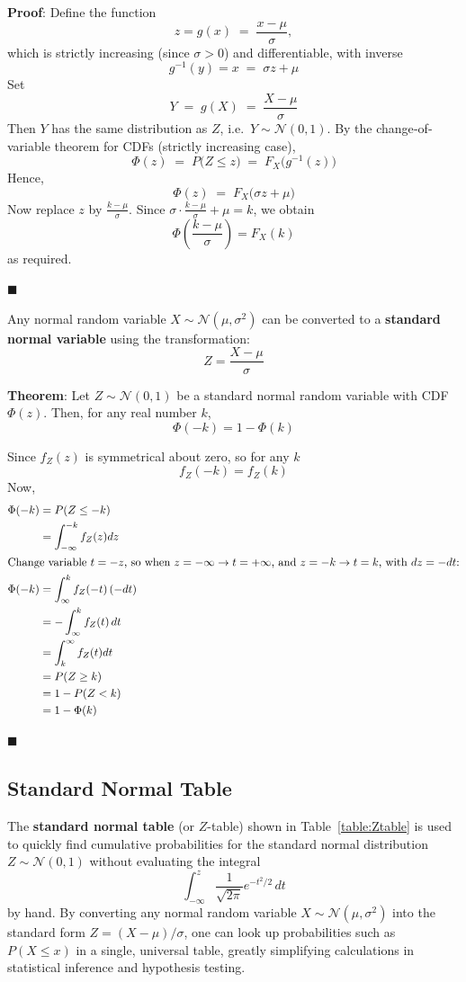 \documentclass[twoside]{book}
\begin{document}
\textbf{Proof}: Define the function
\[
z = g(x) \;=\; \frac{x - \mu}{\sigma},
\]
which is strictly increasing (since \(\sigma>0\)) and differentiable, with inverse
\[
g^{-1}(y) = x \;=\; \sigma z + \mu
\]
Set
\[
Y \;=\; g(X) \;=\; \frac{X - \mu}{\sigma}
\]
Then \(Y\) has the same distribution as \(Z\), i.e.\ \(Y\sim \mathcal{N}(0,1)\).  By the change‐of‐variable theorem for CDFs (strictly increasing case),
\[
\Phi(z)
\;=\;
P\bigl(Z \le z\bigr)
\;=\;
F_X\!\bigl(g^{-1}(z)\bigr)
\]
Hence,
\[
\Phi(z)
\;=\;
F_X\!\bigl(\sigma z + \mu\bigr)
\]
Now replace \(z\) by \(\tfrac{k-\mu}{\sigma}\).  Since
\(\sigma\cdot\tfrac{k-\mu}{\sigma} + \mu = k\), we obtain
\[
\Phi\!\left( \dfrac{k - \mu}{\sigma}\right)  = F_X(k)
\]
as required.


\hfill $\blacksquare$

Any normal random variable $X \sim \mathcal{N}(\mu, \sigma^2)$ can be converted to a \textbf{standard normal variable} using the transformation:
\[
Z = \dfrac{X - \mu}{\sigma}
\]

\begin{textbox}
\textbf{Theorem}: Let \( Z \sim \mathcal{N}(0,1) \) be a standard normal random variable with CDF \( \Phi(z) \). Then, for any real number \( k \),
\[
\Phi(-k) = 1 - \Phi(k)
\]
\end{textbox}

Since $f_Z(z)$ is symmetrical about zero, so for any $k$
$$f_Z(-k) = f_Z(k)$$
Now,
\begin{align*}
\Phi(-k)
&= P(Z \le -k) \\
&= \int_{-\infty}^{-k} f_Z(z)dz\\
\intertext{Change variable $t=-z$, so when $z=-\infty\to t=+\infty$, and $z=-k\to t=k$, with $dz=-dt$:}
\Phi(-k) &= \int_{\infty}^{k} f_Z(-t)\,(-dt) \\
&= -\int_{\infty}^{k} f_Z(t)\,dt \\
&= \int_{k}^{\infty} f_Z(t)dt\\
&= P(Z \ge k)\\
&= 1 - P(Z < k)\\
&= 1 - \Phi(k)
\end{align*}

\hfill $\blacksquare$

\subsection{Standard Normal Table}

The \textbf{standard normal table} (or $Z$-table)  shown in Table~\ref{table:Ztable} is used to quickly find cumulative probabilities for the standard normal distribution \(Z\sim\mathcal{N}(0,1)\) without evaluating the integral $$\int_{-\infty}^z \dfrac{1}{\sqrt{2\pi}}e^{-t^2/2}\,dt$$ by hand.  By converting any normal random variable \(X\sim \mathcal{N}(\mu,\sigma^2)\) into the standard form \(Z=(X-\mu)/\sigma\), one can look up probabilities such as \(P(X\le x)\) in a single, universal table, greatly simplifying calculations in statistical inference and hypothesis testing.
\end{document}
